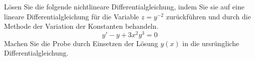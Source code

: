 \begin{atiTask}[
	title = Eine nichtlineare Differentialgleichung,
	topic = Gewöhnliche Differentialgleichungen,
	subtopic = Lineare Differentialgleichungen 1. Ordnung,
	language = Deutsch,
]
	Lösen Sie die folgende nichtlineare Differentialgleichung, indem Sie sie auf eine lineare Differentialgleichung für die Variable $z = y^{-2}$ zurückführen und durch die Methode der Variation der Konstanten behandeln.
	\[
		y' - y + 3x^2y^3 = 0
	\]
	Machen Sie die Probe durch Einsetzen der Lösung $y(x)$ in die ursrüngliche Differentialgleichung.
\end{atiTask}